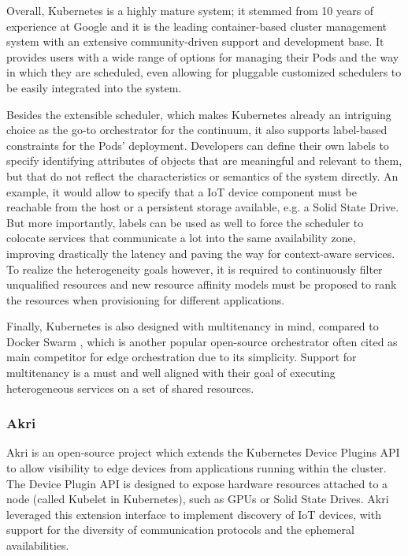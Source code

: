 \documentclass{ieeeaccess}
\begin{document}
Overall, Kubernetes is a highly mature system; it stemmed from 10 years of experience at Google and it is the leading container-based cluster management system with an extensive community-driven support and development base. It provides users with a wide range of options for managing their Pods and the way in which they are scheduled, even allowing for pluggable customized schedulers to be easily integrated into the system.

Besides the extensible scheduler, which makes Kubernetes already an intriguing choice as the go-to orchestrator for the continuum, it also supports label-based constraints for the Pods' deployment. Developers can define their own labels to specify identifying attributes of objects that are meaningful and relevant to them, but that do not reflect the characteristics or semantics of the system directly. An example, it would allow to specify that a IoT device component must be reachable from the host or a persistent storage available, e.g. a Solid State Drive. But more importantly, labels can be used as well to force the scheduler to colocate services that communicate a lot into the same availability zone, improving drastically the latency and paving the way for context-aware services. To realize the heterogeneity goals however, it is required to continuously filter unqualified resources and new resource affinity models must be proposed to rank the resources when provisioning for different applications. 

Finally, Kubernetes is also designed with multitenancy in mind, compared to Docker Swarm \cite{docker-swarm}, which is another popular open-source orchestrator often cited as main competitor for edge orchestration due to its simplicity. Support for multitenancy is a must and well aligned with their goal of executing heterogeneous services on a set of shared resources.

\subsubsection{Akri}

Akri \cite{akri} is an open-source project which extends the Kubernetes Device Plugins API \cite{k8s-device-plugins} to allow visibility to edge devices from applications running within the cluster. The Device Plugin API is designed to expose hardware resources attached to a node (called Kubelet in Kubernetes), such as GPUs or Solid State Drives. Akri leveraged this extension interface to implement discovery of IoT devices, with support for the diversity of communication protocols and the ephemeral availabilities.
\end{document}
